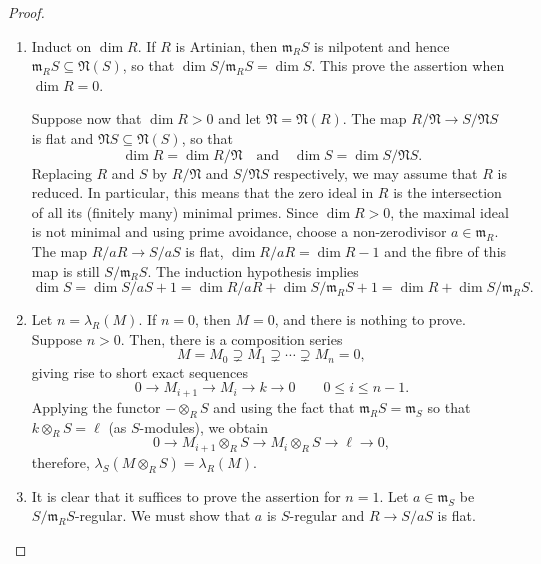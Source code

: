 \documentclass[10pt]{article}
\theoremstyle{thmstyle}
\theoremstyle{defstyle}
\newcommand{\frakm}{\mathfrak{m}} %
\newcommand{\frakN}{\mathfrak{N}} %
\renewcommand{\le}{\leqslant}
\begin{document}
\begin{proof}
\begin{enumerate}[label=(\arabic*)]
    \item Induct on $\dim R$. If $R$ is Artinian, then $\frakm_R S$ is nilpotent and hence $\frakm_R S\subseteq\frakN(S)$, so that $\dim S/\frakm_R S = \dim S$. This prove the assertion when $\dim R = 0$. 

    Suppose now that $\dim R > 0$ and let $\frakN = \frakN(R)$. The map $R/\frakN\to S/\frakN S$ is flat and $\frakN S\subseteq\frakN(S)$, so that 
    \begin{equation*}
        \dim R = \dim R/\frakN\quad\text{and}\quad\dim S = \dim S/\frakN S.
    \end{equation*}
    Replacing $R$ and $S$ by $R/\frakN$ and $S/\frakN S$ respectively, we may assume that $R$ is reduced. In particular, this means that the zero ideal in $R$ is the intersection of all its (finitely many) minimal primes. Since $\dim R > 0$, the maximal ideal is not minimal and using prime avoidance, choose a non-zerodivisor $a\in\frakm_R$. The map $R/aR\to S/aS$ is flat, $\dim R/aR = \dim R - 1$ and the fibre of this map is still $S/\frakm_R S$. The induction hypothesis implies 
    \begin{equation*}
        \dim S = \dim S/aS + 1 = \dim R/aR + \dim S/\frakm_R S + 1 = \dim R + \dim S/\frakm_R S.
    \end{equation*}

    \item Let $n = \lambda_R(M)$. If $n = 0$, then $M = 0$, and there is nothing to prove. Suppose $n > 0$. Then, there is a composition series
    \begin{equation*}
        M = M_0\supsetneq M_1\supsetneq\cdots\supsetneq M_n = 0,
    \end{equation*}
    giving rise to short exact sequences 
    \begin{equation*}
        0\to M_{i + 1}\to M_i\to k\to 0\qquad 0\le i\le n - 1.
    \end{equation*}
    Applying the functor $-\otimes_R S$ and using the fact that $\frakm_R S = \frakm_S$ so that $k\otimes_R S = \ell$ (as $S$-modules), we obtain 
    \begin{equation*}
        0\to M_{i + 1}\otimes_R S\to M_i\otimes_R S\to \ell\to 0,
    \end{equation*}
    therefore, $\lambda_S(M\otimes_R S) = \lambda_R(M)$.

    \item It is clear that it suffices to prove the assertion for $n = 1$. Let $a\in\frakm_S$ be $S/\frakm_R S$-regular. We must show that $a$ is $S$-regular and $R\to S/aS$ is flat.


\end{enumerate}
\end{proof}
\end{document}
